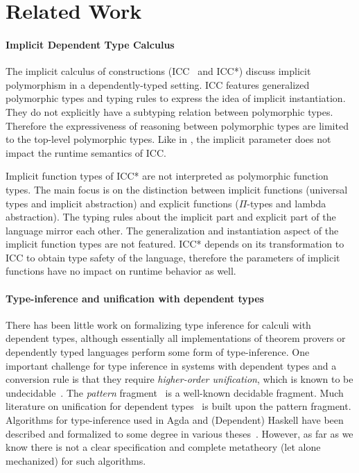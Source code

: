 \section{Related Work}

\paragraph{Implicit Dependent Type Calculus}
The implicit calculus of constructions (ICC~\cite{miquel2001implicit} and
ICC*\cite{barras2008implicit}) discuss implicit polymorphism in a dependently-typed
setting. ICC features generalized polymorphic types and typing rules to express
the idea of implicit instantiation. They do not explicitly have a subtyping
relation between polymorphic types. Therefore the expressiveness of reasoning
between polymorphic types are limited to the top-level polymorphic types. Like
in \name, the implicit parameter does not impact the runtime semantics of ICC.

Implicit function types of ICC* are not interpreted as polymorphic
function types. The main focus is on the distinction between implicit
functions (universal types and implicit abstraction) and explicit functions
($\Pi$-types and lambda abstraction).
The typing rules about the implicit part and explicit part of the language mirror
each other. The generalization and instantiation aspect of the implicit function
types are not featured. ICC* depends on its transformation to ICC to obtain type safety
of the language, therefore the parameters of implicit functions have no impact
on runtime behavior as well.

\paragraph{Type-inference and unification with dependent types}
There has been little work on formalizing type inference for calculi
with dependent types, although essentially all implementations of
theorem provers or dependently typed languages perform some form of
type-inference.
One important challenge for type inference in
systems with dependent types and a conversion rule
is that they require \emph{higher-order unification},
which is known to be undecidable~\cite{goldfarb1981undecidability}. The \textit{pattern}
fragment~\cite{miller1991unification} is a well-known decidable
fragment. Much literature on unification for dependent
types~\cite{reed2009higher,abel2011higher, gundry2013tutorial, Cockx:2016:UEP:2951913.2951917, ziliani2015unification, coen2004mathematical} is
built upon the pattern fragment. Algorithms for type-inference used in Agda and
(Dependent) Haskell have been described and formalized to some degree
in various theses~\cite{norell,gundry,dh}. However, as far as we know
there is not a clear specification and complete metatheory (let alone
mechanized) for such algorithms.

